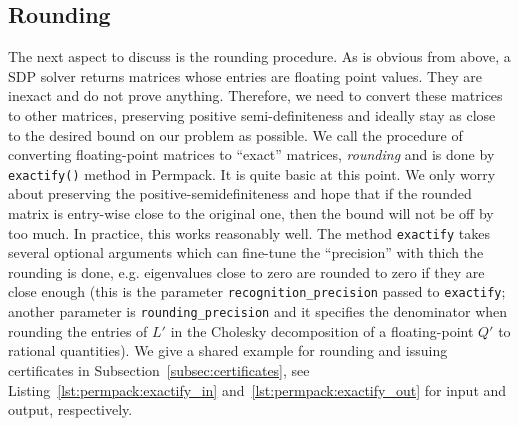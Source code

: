 \subsection{Rounding}
The next aspect to discuss is the rounding procedure. As is obvious from above, a SDP solver returns matrices whose entries are floating point values. They are inexact and do not prove anything. Therefore, we need to convert these matrices to other matrices, preserving positive semi-definiteness and ideally stay as close to the desired bound on our problem as possible. We call the procedure of converting floating-point matrices to ``exact'' matrices, \emph{rounding} and is done by \texttt{exactify()} method in Permpack. It is quite basic at this point. We only worry about preserving the positive-semidefiniteness and hope that if the rounded matrix is entry-wise close to the original one, then the bound will not be off by too much. In practice, this works reasonably well. The method \texttt{exactify} takes several optional arguments which can fine-tune the ``precision'' with thich the rounding is done, e.g. eigenvalues close to zero are rounded to zero if they are close enough (this is the parameter \texttt{recognition\_precision} passed to \texttt{exactify}; another parameter is \texttt{rounding\_precision} and it specifies the denominator when rounding the entries of $L'$ in the Cholesky decomposition of a floating-point $Q'$ to rational quantities). We give a shared example for rounding and issuing certificates in Subsection~\ref{subsec:certificates}, see Listing~\ref{lst:permpack:exactify_in} and~\ref{lst:permpack:exactify_out} for input and output, respectively.

